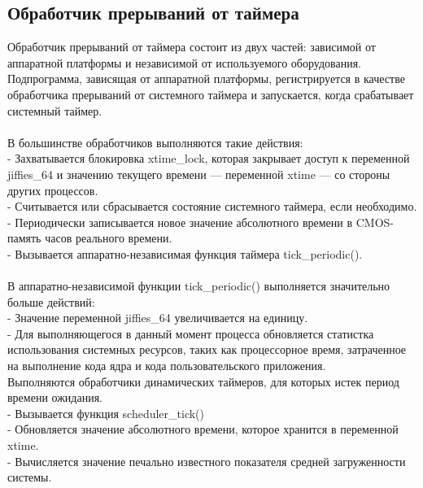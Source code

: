     \subsection{Обработчик прерываний от таймера}
    Обработчик прерываний от таймера состоит из двух частей: зависимой от аппаратной платформы и независимой от используемого оборудования. Подпрограмма, зависящая от аппаратной платформы, регистрируется в качестве обработчика прерываний от системного таймера и запускается, когда срабатывает системный таймер.
    \\\\
    В большинстве обработчиков выполняются такие действия:
    \\
    - Захватывается блокировка xtime\_lock, которая закрывает доступ к переменной jiffies\_64 и значению текущего времени — переменной xtime — со стороны других процессов.
    \\
    - Считывается или сбрасывается состояние системного таймера, если необходимо.
    \\
    - Периодически записывается новое значение абсолютного времени в CMOS-память часов реального времени.
    \\
    - Вызывается аппаратно-независимая функция таймера tick\_periodic().
    \\\\
    В аппаратно-независимой функции tick\_periodic() выполняется значительно больше действий:
    \\
    - Значение переменной jiffies\_64 увеличивается на единицу.
    \\
    - Для выполняющегося в данный момент процесса обновляется статистка использования системных ресурсов, таких как процессорное время, затраченное на выполнение кода ядра и кода пользовательского приложения.
    \\
    Выполняются обработчики динамических таймеров, для которых истек период
    времени ожидания.
    \\
    - Вызывается функция scheduler\_tick()
    \\
    - Обновляется значение абсолютного времени, которое хранится в переменной xtime.
    \\
    - Вычисляется значение печально известного показателя средней загруженности системы.

